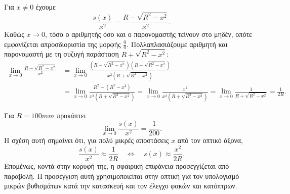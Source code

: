 \lysh
Για $x\neq 0$ έχουμε
\[
  \frac{s(x)}{x^2}
  =\frac{R-\sqrt{R^2-x^2}}{x^2}.
\]
Καθώς $x\to 0$, τόσο ο αριθμητής όσο και ο παρονομαστής τείνουν στο
μηδέν, οπότε εμφανίζεται απροσδιοριστία της μορφής $\frac{0}{0}$.
Πολλαπλασιάζουμε αριθμητή και παρονομαστή με τη συζυγή παράσταση
$R+\sqrt{R^2-x^2}$:
\begin{align*}
\lim\limits_{x\to 0}\frac{R-\sqrt{R^2-x^2}}{x^2}
&=\lim\limits_{x\to 0}
  \frac{\left(R-\sqrt{R^2-x^2}\right)
        \left(R+\sqrt{R^2-x^2}\right)}
       {x^2\left(R+\sqrt{R^2-x^2}\right)}\\
&=\lim\limits_{x\to 0}
  \frac{R^2-\left(R^2-x^2\right)}
       {x^2\left(R+\sqrt{R^2-x^2}\right)}=\lim\limits_{x\to 0}
  \frac{x^2}
       {x^2\left(R+\sqrt{R^2-x^2}\right)}=\lim\limits_{x\to 0}
  \frac{1}{R+\sqrt{R^2-x^2}}
  =\frac{1}{2R}.
\end{align*}

Για $R=100\si{mm}$ προκύπτει
\[
  \lim\limits_{x\to 0}\frac{s(x)}{x^2}
  =\frac{1}{200}.
\]
Η σχέση αυτή σημαίνει ότι, για πολύ μικρές αποστάσεις $x$ από τον οπτικό
άξονα,
\[
  \frac{s(x)}{x^2}\approx\frac{1}{2R}
  \quad\Longleftrightarrow\quad
  s(x)\approx\frac{x^2}{2R}.
\]
Επομένως, κοντά στην κορυφή της, η σφαιρική επιφάνεια προσεγγίζεται από
παραβολή. Η προσέγγιση αυτή χρησιμοποιείται στην οπτική για τον
υπολογισμό μικρών βυθισμάτων κατά την κατασκευή και τον έλεγχο φακών και
κατόπτρων.\\


